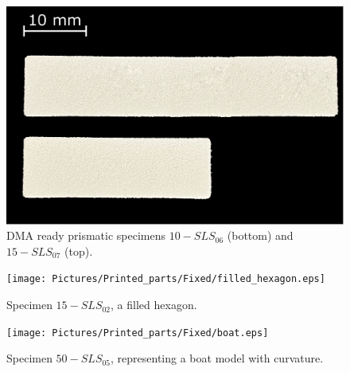 \documentclass{article}
\begin{document}
        \begin{figure}[ht]
            \centering
            \includegraphics[width=\textwidth]{Pictures/Printed_parts/Fixed/DMA_samples.eps}
            \caption{DMA ready prismatic specimens $10-SLS_{06}$ (bottom) and $15-SLS_{07}$ (top).}
            \label{fig:printed_specimens_DMA}
        \end{figure}

        \begin{figure}[ht]
            \centering
            \texttt{[image: Pictures/Printed\_parts/Fixed/filled\_hexagon.eps]}
            \caption{Specimen $15-SLS_{02}$, a filled hexagon.}
            \label{fig:printed_specimens_filledhexagon}
        \end{figure}

        \begin{figure}[ht]
            \centering
            \texttt{[image: Pictures/Printed\_parts/Fixed/boat.eps]}
            \caption{Specimen $50-SLS_{05}$, representing a boat model with curvature.}
            \label{fig:printed_specimens_boat}
        \end{figure}
\end{document}
